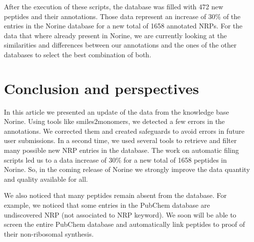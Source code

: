 \documentclass[long, final]{jobim2017}
\begin{document}
After the execution of these scripts, the database was filled with 472 new peptides and their annotations.
Those data represent an increase of 30\% of the entries in the Norine database for a new total of 1658 annotated NRPs.
For the data that where already present in Norine, we are currently looking at the similarities and differences between our annotations and the ones of the other databases to select the best combination of both.


\section{Conclusion and perspectives}

In this article we presented an update of the data from the knowledge base Norine.
Using tools like smiles2monomers, we detected a few errors in the annotations.
We corrected them and created safeguards to avoid errors in future user submissions.
In a second time, we used several tools to retrieve and filter many possible new NRP entries in the database.
The work on automatic filing scripts led us to a data increase of 30\% for a new total of 1658 peptides in Norine.
So, in the coming release of Norine we strongly improve the data quantity and quality available for all.

We also noticed that many peptides remain absent from the database.
For example, we noticed that some entries in the PubChem database are undiscovered NRP (not associated to NRP keyword).
We soon will be able to screen the entire PubChem database and automatically link peptides to proof of their non-ribosomal synthesis.



 
 
\end{document}

